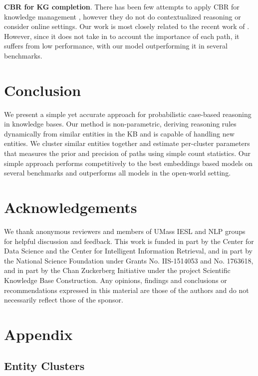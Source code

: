 \documentclass[11pt,a4paper]{article}
\begin{document}
\textbf{CBR for KG completion}. There has been few attempts to apply CBR for knowledge management \cite{dubitzky1999viewing,bartlmae2000case},  however they do not do contextualized reasoning or consider online settings.
Our work is most closely related to the recent work of \citet{cbr}. However, since it does not take in to account the importance of each path, it suffers from low performance, with our model outperforming it in several benchmarks. \section{Conclusion}
\vspace{-1.5mm}
\label{sec:conclusion}
We present a simple yet accurate approach for probabilistic case-based reasoning in knowledge bases. Our method is non-parametric, deriving reasoning rules dynamically from similar entities in the KB and is capable of handling new entities. We cluster similar entities together and estimate per-cluster parameters that measures the prior and precision of paths using simple count statistics. Our simple approach performs competitively to the best embeddings based models on several benchmarks and outperforms all models in the open-world setting.

\section*{Acknowledgements}
We thank anonymous reviewers and members of UMass IESL and NLP groups for helpful discussion and feedback. This work is funded in part by the Center for Data Science and the Center for Intelligent Information
Retrieval, and in part by the National Science Foundation under Grants No. IIS-1514053 and No. 1763618, and in part by the Chan Zuckerberg Initiative under the project Scientific Knowledge
Base Construction. Any opinions, findings and conclusions or recommendations expressed in this
material are those of the authors and do not necessarily reflect those of the sponsor.


\newpage
\clearpage
\appendix

\section{Appendix}
\subsection{Entity Clusters}
\end{document}
